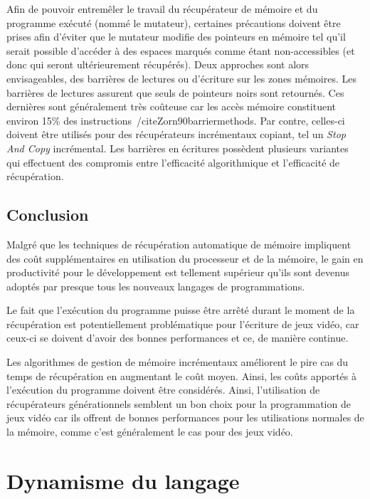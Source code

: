 \documentclass[12pt,oneside,letterpaper,francais]{book}
\begin{document}
Afin de pouvoir entremêler le travail du récupérateur de mémoire et du
programme exécuté (nommé le mutateur), certaines précautions doivent
être prises afin d'éviter que le mutateur modifie des pointeurs en
mémoire tel qu'il serait possible d'accéder à des espaces marqués
comme étant non-accessibles (et donc qui seront ultérieurement
récupérés). Deux approches sont alors envisageables, des barrières de
lectures ou d'écriture sur les zones mémoires. Les barrières de
lectures assurent que seuls de pointeurs noirs sont retournés. Ces
dernières sont généralement très coûteuse car les accès mémoire
constituent environ 15\% des
instructions~/cite{Zorn90barriermethods}. Par contre, celles-ci
doivent être utilisés pour des récupérateurs incrémentaux copiant, tel
un \textit{Stop And Copy} incrémental. Les barrières en écritures
possèdent plusieurs variantes qui effectuent des compromis entre
l'efficacité algorithmique et l'efficacité de récupération. 


\subsection{Conclusion}

Malgré que les techniques de récupération automatique de mémoire
impliquent des coût supplémentaires en utilisation du processeur et de
la mémoire, le gain en productivité pour le développement est
tellement supérieur qu'ils sont devenus adoptés par presque tous les
nouveaux langages de programmations.

Le fait que l'exécution du programme puisse être arrêté durant le
moment de la récupération est potentiellement problématique pour
l'écriture de jeux vidéo, car ceux-ci se doivent d'avoir des bonnes
performances et ce, de manière continue. 

Les algorithmes de gestion de mémoire incrémentaux améliorent le pire
cas du temps de récupération en augmentant le coût moyen. Ainsi, les
coûts apportés à l'exécution du programme doivent être
considérés. Ainsi, l'utilisation de récupérateurs générationnels
semblent un bon choix pour la programmation de jeux vidéo car ils
offrent de bonnes performances pour les utilisations normales de la
mémoire, comme c'est généralement le cas pour des jeux vidéo.



\section{Dynamisme du langage}
\end{document}
